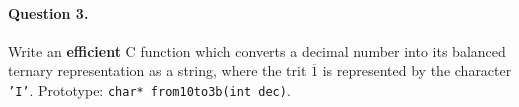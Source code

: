 \paragraph{Question 3.} Write an \textbf{efficient} \textsf{C} function which
converts a decimal number into its balanced ternary representation as
a string, where the trit \(\overline{1}\) is
represented by the character \texttt{'I'}. Prototype:
\verb|char* from10to3b(int dec)|.


